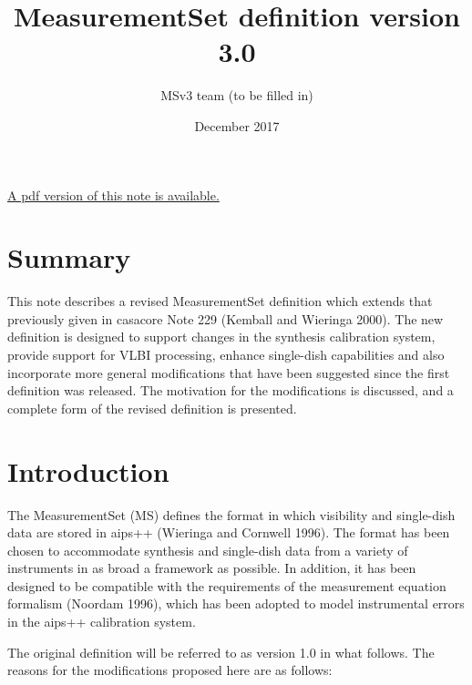 \documentclass{article}
\begin{document}
\title{MeasurementSet definition version 3.0}
\author{MSv3 team (to be filled in)}
\date{December 2017}
\maketitle

\ifpdf
\else
\href{264.pdf}{A pdf version of this note is available.}
\fi

\tableofcontents 
\section{Summary} 

This note describes a revised MeasurementSet definition which extends
that previously given in casacore Note 229 (Kemball and Wieringa 2000).
The new definition is designed to support changes in the
synthesis calibration system, provide support for VLBI processing,
enhance single-dish capabilities and also incorporate more general
modifications that have been suggested since the first definition was
released.  The motivation for the modifications is discussed, and a
complete form of the revised definition is presented.

\section{Introduction}

The MeasurementSet (MS) defines the format in which visibility and
single-dish data are stored in aips++ (Wieringa and Cornwell
1996). The format has been chosen to accommodate synthesis and
single-dish data from a variety of instruments in as broad a framework
as possible. In addition, it has been designed to be compatible with
the requirements of the measurement equation formalism (Noordam 1996),
which has been adopted to model instrumental errors in the aips++
calibration system.

The original definition will be referred to as version 1.0 in what
follows. The reasons for the modifications proposed here are as
follows:
\end{document}
